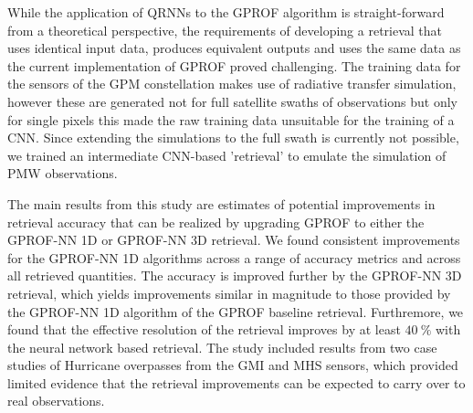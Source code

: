 While the application of QRNNs to the GPROF algorithm is straight-forward from a
theoretical perspective, the requirements of developing a retrieval that uses
identical input data, produces equivalent outputs and uses the same data as the
current implementation of GPROF proved challenging. The training data for the
sensors of the GPM constellation makes use of radiative transfer simulation,
however these are generated not for full satellite swaths of observations but
only for single pixels this made the raw training data unsuitable for the
training of a CNN. Since extending the simulations to the full swath is
currently not possible, we trained an intermediate CNN-based 'retrieval' to
emulate the simulation of PMW observations.


The main results from this study are estimates of potential improvements in
retrieval accuracy that can be realized by upgrading GPROF to either the
GPROF-NN 1D or GPROF-NN 3D retrieval. We found consistent improvements for the
GPROF-NN 1D algorithms across a range of accuracy metrics and across all
retrieved quantities. The accuracy is improved further by the GPROF-NN 3D
retrieval, which yields improvements similar in magnitude to those provided by
the GPROF-NN 1D algorithm of the GPROF baseline retrieval. Furthremore, we found
that the effective resolution of the retrieval improves by at least
$\SI{40}{\percent}$ with the neural network based retrieval. The study included
results from two case studies of Hurricane overpasses from the GMI and MHS
sensors, which provided limited evidence that the retrieval improvements can be
expected to carry over to real observations.

